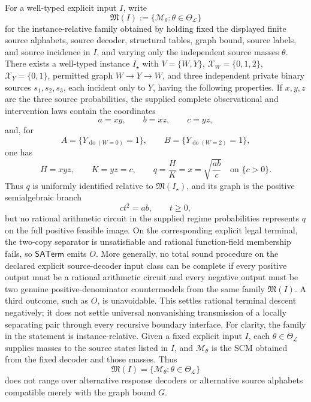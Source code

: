 For a well-typed explicit input \(I\), write
\[
 \mathfrak M(I):=\{\mathcal M_\theta:\theta\in\Theta_{\mathcal L}\}
\]
for the instance-relative family obtained by holding fixed the displayed finite source alphabets, source decoder, structural tables, graph bound, source labels, and source incidence in \(I\), and varying only the independent source masses \(\theta\).  There exists a well-typed instance \(I_\star\) with \(V=\{W,Y\}\), \(\mathcal X_W=\{0,1,2\}\), \(\mathcal X_Y=\{0,1\}\), permitted graph \(W\to Y\to W\), and three independent private binary sources \(s_1,s_2,s_3\), each incident only to \(Y\), having the following properties.  If \(x,y,z\) are the three source probabilities, the supplied complete observational and intervention laws contain the coordinates
\[
 a=xy,\qquad b=xz,\qquad c=yz,
\]
and, for
\[
 A=\{Y_{\operatorname{do}(W=0)}=1\},\qquad
 B=\{Y_{\operatorname{do}(W=2)}=1\},
\]
one has
\[
 H=xyz,\qquad K=yz=c,
 \qquad q=\frac{H}{K}=x=\sqrt{\frac{ab}{c}}
 \quad\text{on }\{c>0\}.
\]
Thus \(q\) is uniformly identified relative to \(\mathfrak M(I_\star)\), and its graph is the positive semialgebraic branch
\[
 c t^2=ab,\qquad t\geq0,
\]
but no rational arithmetic circuit in the supplied regime probabilities represents \(q\) on the full positive feasible image.  On the corresponding explicit legal terminal, the two-copy separator is unsatisfiable and rational function-field membership fails, so \(\mathsf{SATerm}\) emits \(O\).  More generally, no total sound procedure on the declared explicit source-decoder input class can be complete if every positive output must be a rational arithmetic circuit and every negative output must be two genuine positive-denominator countermodels from the same family \(\mathfrak M(I)\).  A third outcome, such as \(O\), is unavoidable.  This settles rational terminal descent negatively; it does not settle universal nonvanishing transmission of a locally separating pair through every recursive boundary interface.
For clarity, the family in the statement is instance-relative.  Given a fixed explicit input \(I\), each \(\theta\in\Theta_{\mathcal L}\) supplies masses to the source states listed in \(I\), and \(\mathcal M_\theta\) is the SCM obtained from the fixed decoder and those masses.  Thus
\[
 \mathfrak M(I)=\{\mathcal M_\theta:\theta\in\Theta_{\mathcal L}\}
\]
does not range over alternative response decoders or alternative source alphabets compatible merely with the graph bound \(G\).

